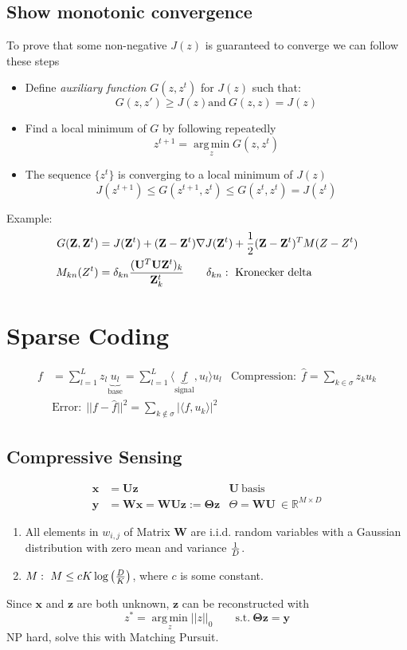 \documentclass[a4paper,11pt,landscape]{article}
\newcommand{\argmin}{\operatorname*{arg\,min}}
\newcommand{\R}{\mathbb{R}}
\newcommand{\sectionline}{\noindent\makebox[\linewidth]{\rule{\columnwidth}{0.1pt}}}
\newcommand{\msection}[1]{\vspace{-1mm}\sectionline\vspace{-1mm}\section{#1}\vspace{-1mm}}
\begin{document}
\begin{multicols}{3}
\subsection{Show monotonic convergence}
To prove that some non-negative $J(z)$ is guaranteed to converge we can follow these steps
\begin{itemize}
 \item Define \emph{auxiliary function} $G(z,z^t)$ for $J(z)$ such that:
 \[
  G(z,z') \geq J(z) \text{and}\ G(z,z) = J(z)
 \]
 \item Find a local minimum of $G$ by following repeatedly
 \[
  z^{t+1} = \argmin_z G(z,z^t)
 \]
 \item The sequence $\{z^t\}$ is converging to a local minimum of $J(z)$
 \[
  J(z^{t+1}) \leq G(z^{t+1}, z^t) \leq G(z^t, z^t) = J(z^t)
 \]
\end{itemize}
Example:
\begin{align*}
 G(\mathbf Z,\mathbf Z^t) &= J(\mathbf Z^t) + (\mathbf Z - \mathbf Z^t)\nabla J(\mathbf Z^t) + {1\over 2}(\mathbf Z- \mathbf Z^t)^T M(Z-Z^t)\\
 M_{kn}(Z^t) &=\delta_{kn}{(\mathbf U^T \mathbf U \mathbf Z^t)_k \over \mathbf Z_k^t} \qquad \delta_{kn}:\ \text{Kronecker delta}
\end{align*}

\msection{Sparse Coding}
\begin{align*}
 f &= \sum_{l=1}^L z_l \underbrace{u_l}_{\text{base}} = \sum_{l=1}^L \langle \underbrace{f}_\text{signal}, u_l\rangle u_l &
 \text{Compression:}\ \ \hat{f} = \sum_{k\in \sigma} z_k u_k\\
 &\text{Error:}\ \ ||f-\hat f||^2 = \sum_{k \notin \sigma} | \langle f, u_k\rangle|^2
\end{align*}

\subsection{Compressive Sensing}
\begin{align*}
 \mathbf x &= \mathbf{U} \mathbf z &\mathbf U \ \text{basis}\\
 \mathbf y &= \mathbf W \mathbf x = \mathbf W \mathbf U \mathbf z := \mathbf \Theta \mathbf z & \Theta = \mathbf W \mathbf U \ \in \R^{M\times D}
\end{align*}
\begin{enumerate}
 \item All elements in $w_{i,j}$ of Matrix $\mathbf W$ are i.i.d. random variables with a Gaussian distribution with zero mean and variance ${1 \over D}$.
 \item $M:\ M \leq cK\log\left({D\over K}\right)$, where $c$ is some constant.
\end{enumerate}
Since $\mathbf x$ and $\mathbf z$ are both unknown, $\mathbf z$ can be reconstructed with
\[
 z^* = \argmin_z ||z||_0 \qquad \text{s.t.}\ \mathbf \Theta \mathbf z = \mathbf y
\]
NP hard, solve this with Matching Pursuit.


\end{multicols}
\end{document}
